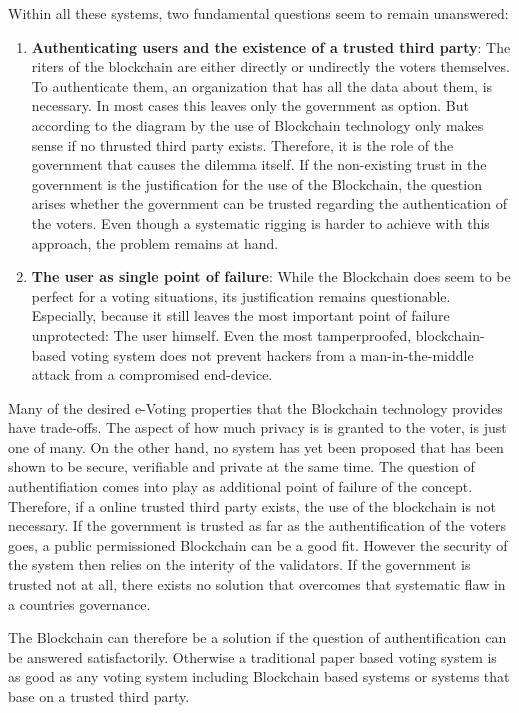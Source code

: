 Within all these systems, two fundamental questions seem to remain unanswered:
\begin{enumerate}
	\item \textbf{Authenticating users and the existence of a trusted third party}:	The riters of the blockchain are either directly or undirectly the voters themselves. To authenticate them, an organization that has all the data about them, is necessary. In most cases this leaves only the government as option. But according to the diagram by  \citeauthor{Wust2017} the use of Blockchain technology only makes sense if no thrusted third party exists. Therefore, it is the role of the government that causes the dilemma itself. If the non-existing trust in the government is the justification for the use of the Blockchain, the question arises whether the government can be trusted regarding the authentication of the voters. Even though a systematic rigging is harder to achieve with this approach, the problem remains at hand. 
	\item \textbf{The user as single point of failure}: While the Blockchain does seem to be perfect for a voting situations, its justification remains questionable. Especially, because it still leaves the most important point of failure unprotected: The user himself. Even the most tamperproofed, blockchain-based voting system does not prevent hackers from a man-in-the-middle attack from a compromised end-device. 
\end{enumerate}

Many of the desired e-Voting properties that the Blockchain technology provides have trade-offs. The aspect of how much privacy is is granted to the voter, is just one of many. On the other hand, no system has yet been proposed that has been shown to be secure, verifiable and private at the same time. The question of authentifiation comes into play as additional point of failure of the concept.
Therefore, if a online trusted third party exists, the use of the blockchain is not necessary. If the government is trusted as far as the authentification of the voters goes, a public permissioned Blockchain can be a good fit. However the security of the system then relies on the interity of the validators. 
If the government is trusted not at all, there exists no solution that overcomes that systematic flaw in a countries governance.

The Blockchain can therefore be a solution if the question of authentification can be answered satisfactorily. Otherwise a traditional paper based voting system is as good as any voting system including Blockchain based systems or systems that base on a trusted third party.

